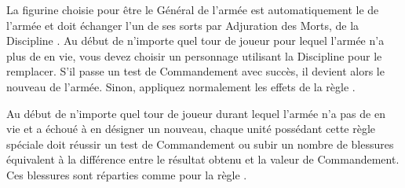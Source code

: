 \newcommand{\voncastelstein}{\specialrule{Von Castelstein}\xspace}
\newcommand{\sisterhoodofthesilverkeepbloodline}{\specialrule{Dynastie de la Sororité du Donjon d'Argent}\xspace}
\newcommand{\sisterhoodofthesilverkeep}{\specialrule{Sororité du Donjon d'Argent}\xspace}
\newcommand{\nosferatubloodline}{\specialrule{Dynastie des Nosferatu}\xspace}
\newcommand{\nosferatu}{\specialrule{Nosferatu}\xspace}
\newcommand{\unlivingshield}{\specialrule{Bouclier Non-Vivant}\xspace}
\newcommand{\disturbingswarm}{\specialrule{Essaim Perturbant}\xspace}
\def\endlesshorde{\specialrule{Horde sans Fin}\xspace} %
\newcommand{\infernalpyre}{\specialrule{Bûcher Infernal}\xspace}
\newcommand{\unholyconvergence}{\specialrule{Convergence Profanatrice}\xspace}
\newcommand{\cart}{\specialrule{Charrette}\xspace}
\newcommand{\undeadconstructs}{\specialrule{Construction Nécromantique}\xspace}
\newcommand{\infernaltome}{\specialrule{Recueil Infernal}\xspace}
\newcommand{\necroticaura}{\specialrule{Aura Nécrotique}\xspace}
\newcommand{\evocationofsouls}{\specialrule{Évocation des Âmes}\xspace}
\newcommand{\greaterzombiedragon}{\specialrule{Gigantesque Dragon Zombie}\xspace}





\armyspecialrules

\armyspecialruleentry{\leadersoftheundead}

La figurine choisie pour être le Général de l'armée est automatiquement le \necroticnexus de l'armée et doit échanger l'un de ses sorts par Adjuration des Morts, de la Discipline \necromancy. Au début de n'importe quel tour de joueur pour lequel l'armée n'a plus de \necroticnexus en vie, vous devez choisir un personnage utilisant la Discipline \necromancy pour le remplacer. S'il passe un test de Commandement avec succès, il devient alors le nouveau \necroticnexus de l'armée. Sinon, appliquez normalement les effets de la règle \ashestoashes .

\armyspecialruleentry{\ashestoashes}

Au début de n'importe quel tour de joueur durant lequel l'armée n'a pas de \necroticnexus en vie et a échoué à en désigner un nouveau, chaque unité possédant cette règle spéciale doit réussir un test de Commandement ou subir un nombre de blessures équivalent à la différence entre le résultat obtenu et la valeur de Commandement. Ces blessures sont réparties comme pour la règle \unstable .

